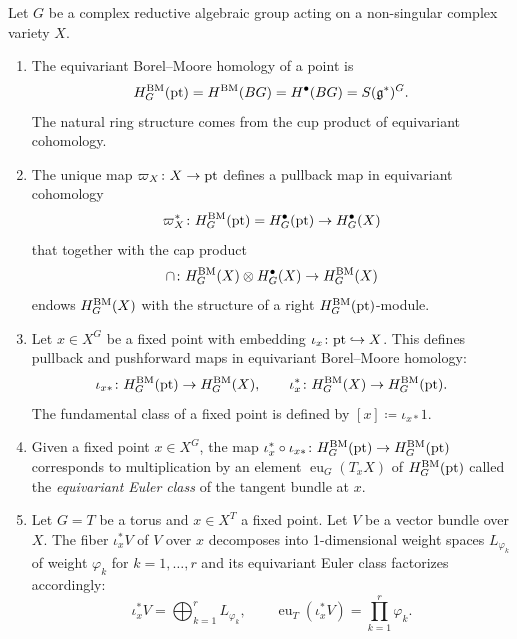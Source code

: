 \begin{prop}
	Let $G$ be a complex reductive algebraic group acting on a non-singular complex variety $X$.
	\begin{enumerate}[label=(\roman*)]
		\item The equivariant Borel--Moore homology of a point is
		\begin{equation}
			H_G^\textup{BM}(\textup{pt}) = H^\textup{BM}(BG) = H^\bullet(BG) = S(\mathfrak{g}^*)^G.
		\end{equation}
		The natural ring structure comes from the cup product of equivariant cohomology.
		\item The unique map $\varpi_X \colon X \to \textup{pt}$ defines a pullback map in equivariant cohomology
		\begin{equation}
			\varpi_X^* \colon H_G^\textup{BM}(\textup{pt}) = H_G^\bullet(\textup{pt}) \to H_G^\bullet(X)
		\end{equation}
		that together with the cap product
		\begin{equation}
			\cap \colon H_G^\textup{BM}(X) \otimes H_G^\bullet(X) \to H_G^\textup{BM}(X)
		\end{equation}
		endows $H_G^\textup{BM}(X)$ with the structure of a right $H_G^\textup{BM}(\textup{pt})$-module.
		\item Let $x \in X^G$ be a fixed point with embedding $\iota_x \colon \textup{pt} \hookrightarrow X$. This defines pullback and pushforward maps in equivariant Borel--Moore homology:
		\begin{equation}
			\iota_{x*} \colon H_G^\textup{BM}(\textup{pt}) \to H_G^\textup{BM}(X), \qquad \iota_x^* \colon H_G^\textup{BM}(X) \to H_G^\textup{BM}(\textup{pt}).
		\end{equation}
		The fundamental class of a fixed point is defined by $[x] \coloneq \iota_{x*} 1$.
		\item Given a fixed point $x \in X^G$, the map $\iota_x^* \circ \iota_{x*} \colon H_G^\textup{BM}(\textup{pt}) \to H_G^\textup{BM}(\textup{pt})$ corresponds to multiplication by an element $\operatorname{eu}_G(T_x X)$ of $H_G^\textup{BM}(\textup{pt})$ called the \emph{equivariant Euler class} of the tangent bundle at $x$.
		\item Let $G=T$ be a torus and $x \in X^T$ a fixed point. Let $V$ be a vector bundle over $X$. The fiber $\iota_x^* V$ of $V$ over $x$ decomposes into 1-dimensional weight spaces $L_{\varphi_k}$ of weight $\varphi_k$ for $k=1,\dots,r$ and its equivariant Euler class factorizes accordingly:
		\begin{equation}
			\iota_x^* V = \bigoplus_{k=1}^r L_{\varphi_k}, \qquad \operatorname{eu}_T(\iota_x^* V) = \prod_{k=1}^r \varphi_k.
		\end{equation}
	\end{enumerate}
\end{prop}

